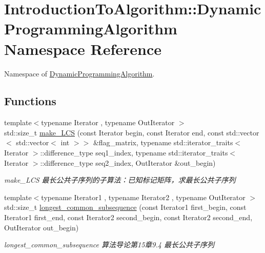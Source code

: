 \hypertarget{namespace_introduction_to_algorithm_1_1_dynamic_programming_algorithm}{}\section{Introduction\+To\+Algorithm\+:\+:Dynamic\+Programming\+Algorithm Namespace Reference}
\label{namespace_introduction_to_algorithm_1_1_dynamic_programming_algorithm}


Namespace of \hyperlink{namespace_introduction_to_algorithm_1_1_dynamic_programming_algorithm}{Dynamic\+Programming\+Algorithm}.  


\subsection*{Functions}
\begin{DoxyCompactItemize}
\item 
{\footnotesize template$<$typename Iterator , typename Out\+Iterator $>$ }\\std\+::size\+\_\+t \hyperlink{namespace_introduction_to_algorithm_1_1_dynamic_programming_algorithm_a377ef4206d4814024272c15c51051f09}{make\+\_\+\+L\+C\+S} (const Iterator begin, const Iterator end, const std\+::vector$<$ std\+::vector$<$ int $>$$>$ \&flag\+\_\+matrix, typename std\+::iterator\+\_\+traits$<$ Iterator $>$\+::difference\+\_\+type seq1\+\_\+index, typename std\+::iterator\+\_\+traits$<$ Iterator $>$\+::difference\+\_\+type seq2\+\_\+index, Out\+Iterator \&out\+\_\+begin)
\begin{DoxyCompactList}\small\item\em make\+\_\+\+L\+C\+S 最长公共子序列的子算法：已知标记矩阵，求最长公共子序列 \end{DoxyCompactList}\item 
{\footnotesize template$<$typename Iterator1 , typename Iterator2 , typename Out\+Iterator $>$ }\\std\+::size\+\_\+t \hyperlink{namespace_introduction_to_algorithm_1_1_dynamic_programming_algorithm_a02edd40c3c2dd3ce1b514284dd42e99c}{longest\+\_\+common\+\_\+subsequence} (const Iterator1 first\+\_\+begin, const Iterator1 first\+\_\+end, const Iterator2 second\+\_\+begin, const Iterator2 second\+\_\+end, Out\+Iterator out\+\_\+begin)
\begin{DoxyCompactList}\small\item\em longest\+\_\+common\+\_\+subsequence 算法导论第15章9.4 最长公共子序列 \end{DoxyCompactList}\end{DoxyCompactItemize}


